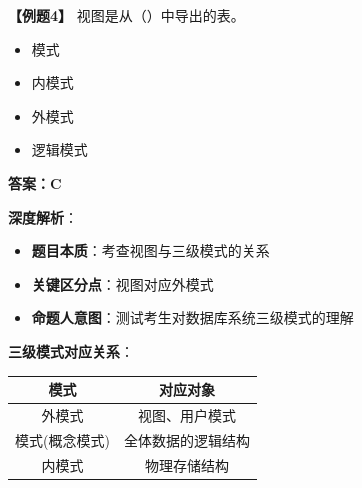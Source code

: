 \documentclass[12pt, a4paper]{article}
\newenvironment{bluebox}[1]{%
  \begin{trivlist}
  \item[\hskip\labelsep \textbf{#1}]
  \setlength{\parskip}{0.5ex}
  \setlength{\itemsep}{0.5ex}
}{%
  \end{trivlist}
}
\begin{document}
\begin{bluebox}{例题4：视图概念}
	\textbf{【例题4】} 视图是从（\quad）中导出的表。

	\begin{itemize}
		\item[A)] 模式
		\item[B)] 内模式
		\item[C)] 外模式
		\item[D)] 逻辑模式
	\end{itemize}

	\textbf{答案：C}

	\textbf{深度解析}：

	\begin{itemize}
		\item \textbf{题目本质}：考查视图与三级模式的关系
		\item \textbf{关键区分点}：视图对应外模式
		\item \textbf{命题人意图}：测试考生对数据库系统三级模式的理解
	\end{itemize}

	\textbf{三级模式对应关系}：
	\begin{tabular}{|c|c|}
		\hline
		\textbf{模式} & \textbf{对应对象} \\
		\hline
		外模式         & 视图、用户模式       \\
		\hline
		模式(概念模式)    & 全体数据的逻辑结构     \\
		\hline
		内模式         & 物理存储结构        \\
		\hline
	\end{tabular}
\end{bluebox}
\end{document}
